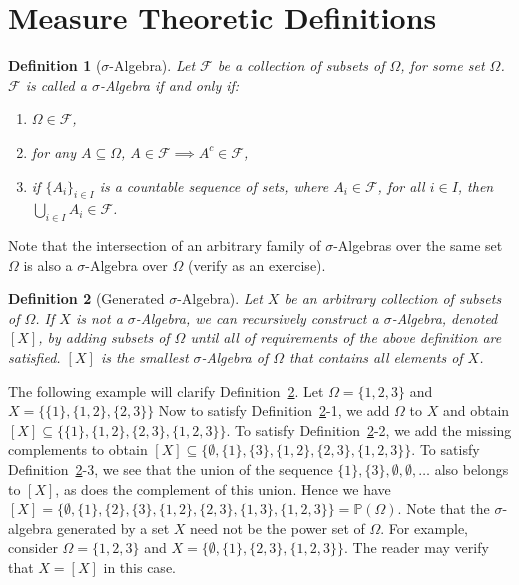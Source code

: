 \documentclass[10pt, oneside]{article}
\newtheorem{defn}{Definition}
\begin{document}
\section{Measure Theoretic Definitions}
\begin{defn}[$\sigma$-Algebra]
    \label{defn:SA}
    Let $\mathcal{F}$ be a collection of subsets of $\Omega$, for some set $\Omega$.
    $\mathcal{F}$ is called a $\sigma$-Algebra if and only if:
    \begin{enumerate}
        \item $\Omega \in \mathcal{F}$, 
        \item for any $A \subseteq \Omega$, $A \in \mathcal{F} \implies 
            A^{c} \in \mathcal{F}$, 
        \item if $\{A_{i}\}_{i \in I}$ is a countable sequence of sets, where $A_i 
            \in \mathcal{F}$, for all $i \in I$, then $\bigcup_{i \in I}A_{i} \in 
            \mathcal{F}$.  
    \end{enumerate} 
\end{defn} 

Note that the intersection of an arbitrary family of $\sigma$-Algebras over the 
same set $\Omega$ is also a $\sigma$-Algebra over $\Omega$ (verify as an exercise). 

\begin{defn}[Generated $\sigma$-Algebra]
    \label{defn:gen-SA}
    Let $X$ be an arbitrary collection of subsets of $\Omega$. If $X$ is not a 
    $\sigma$-Algebra, we can recursively construct a $\sigma$-Algebra, denoted $[X]$,
    by adding subsets of $\Omega$ until all of requirements of the above definition
    are satisfied. $[X]$ is the smallest $\sigma$-Algebra of $\Omega$ that contains
    all elements of $X$. 
\end{defn}

The following example will clarify Definition~\ref{defn:gen-SA}.
Let $\Omega = \{1,2,3\}$ and $X=\{\{1\},\{1,2\},\{2,3\}\}$
Now to satisfy Definition~\ref{defn:gen-SA}-1, we add $\Omega$ to $X$ and obtain $[X]\subseteq\{\{1\},\{1,2\},\{2,3\},\{1,2,3\}\}$.
To satisfy Definition~\ref{defn:gen-SA}-2, we add the missing complements to obtain $[X]\subseteq\{\emptyset, \{1\},\{3\},\{1,2\},\{2,3\},\{1,2,3\}\}$.
To satisfy Definition~\ref{defn:gen-SA}-3, we see that the union of the sequence $\{1\},\{3\},\emptyset,\emptyset,\ldots$ also belongs to $[X]$, as does the complement of this union. Hence we have $[X]= \{\emptyset, \{1\},\{2\},\{3\},\{1,2\},\{2,3\},\{1,3\},\{1,2,3\}\}=\mathbb{P}(\Omega)$.
Note that the $\sigma$-algebra generated by a set $X$ need not be the power set of $\Omega$.
For example, consider $\Omega=\{1,2,3\}$ and $X=\{\emptyset,\{1\},\{2,3\},\{1,2,3\}\}$.
The reader may verify that $X=[X]$ in this case.
\end{document}
